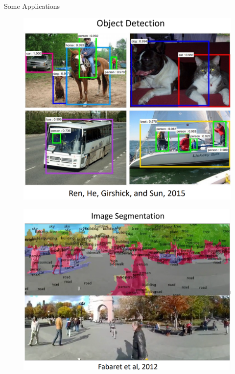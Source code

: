 \documentclass[10pt]{beamer}
\theoremstyle{remark}
\theoremstyle{definition}
\begin{document}
\begin{frame}[allowframebreaks]{Some Applications}
\framebreak

\begin{figure}
\centering
\includegraphics[width=1.0\textwidth,height=0.9\textheight,keepaspectratio]{./images/cv_4.png}
\end{figure}

\framebreak

\begin{figure}
\centering
\includegraphics[width=1.0\textwidth,height=0.9\textheight,keepaspectratio]{./images/cv_5.png}
\end{figure}


\end{frame}
\end{document}

